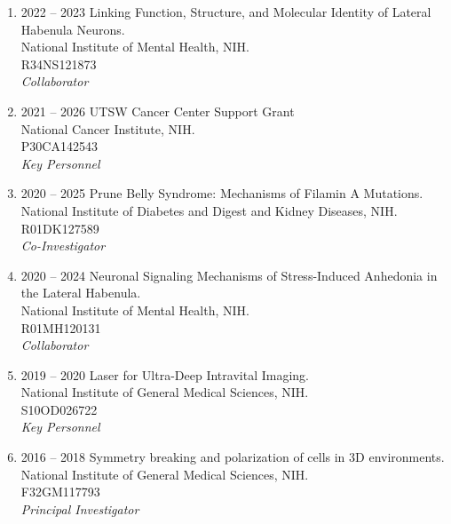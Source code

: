 \begin{enumerate}
\item 2022 -- 2023 
\hspace{8pt}
Linking Function, Structure, and Molecular Identity of Lateral Habenula Neurons. \\
National Institute of Mental Health, NIH. \\
R34NS121873 \\
{\it Collaborator}

\item 2021 -- 2026 
\hspace{8pt}
UTSW Cancer Center Support Grant \\
National Cancer Institute, NIH. \\
P30CA142543 \\ 
{\it Key Personnel}

\item 2020 -- 2025 
\hspace{8pt} 
Prune Belly Syndrome: Mechanisms of Filamin A Mutations. \\
National Institute of Diabetes and Digest and Kidney Diseases, NIH. \\
R01DK127589 \\
{\it Co-Investigator} 

\item 2020 -- 2024
\hspace{8pt} 
Neuronal Signaling Mechanisms of Stress-Induced Anhedonia in the Lateral Habenula. \\
National Institute of Mental Health, NIH. \\
R01MH120131 \\ 
{\it Collaborator}

\item 2019 -- 2020 
\hspace{8pt} 
Laser for Ultra-Deep Intravital Imaging.\\
National Institute of General Medical Sciences, NIH. \\
S10OD026722 \\
{\it Key Personnel}

\item 2016 -- 2018 
\hspace{8pt} 
Symmetry breaking and polarization of cells in 3D environments.\\
National Institute of General Medical Sciences, NIH.\\
F32GM117793 \\
{\it Principal Investigator} 


\end{enumerate}
